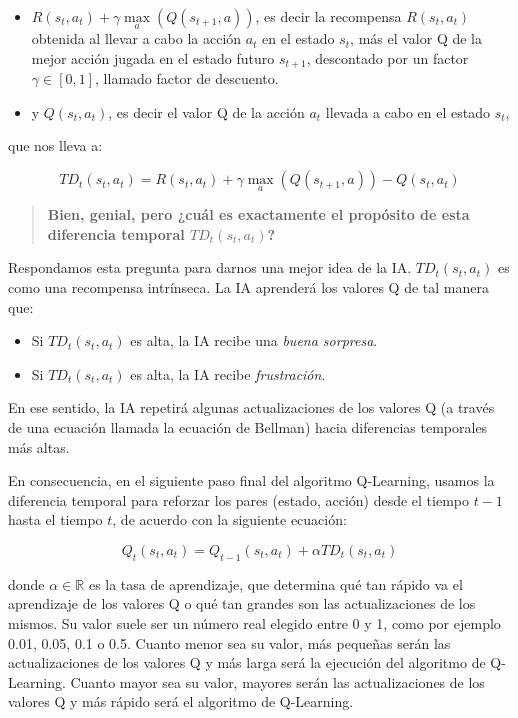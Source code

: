 \documentclass[
]{book}
\providecommand{\tightlist}{%
  \setlength{\itemsep}{0pt}\setlength{\parskip}{0pt}}
\begin{document}
\begin{itemize}
\item
  \(R(s_t,a_t) + \gamma \underset{a}{\max}(Q(s_{t+1},a))\), es decir la recompensa \(R (s_t, a_t)\) obtenida al llevar a cabo la acción \(a_t\) en el estado \(s_t\), más el valor Q de la mejor acción jugada en el estado futuro \(s_{t+1}\), descontado por un factor \(\gamma \in [0,1]\), llamado factor de descuento.
\item
  y \(Q(s_t, a_t)\), es decir el valor Q de la acción \(a_t\) llevada a cabo en el estado \(s_t\),
\end{itemize}

que nos lleva a:

\[TD_t(s_t,a_t) = R(s_t,a_t) + \gamma \underset{a}{\max}(Q(s_{t+1},a)) - Q(s_t,a_t)\]

\begin{quote}
\textbf{Bien, genial, pero ¿cuál es exactamente el propósito de esta diferencia temporal \(TD_t(s_t,a_t)\)?}
\end{quote}

Respondamos esta pregunta para darnos una mejor idea de la IA. \(TD_t (s_t, a_t)\) es como una recompensa intrínseca. La IA aprenderá los valores Q de tal manera que:

\begin{itemize}
\tightlist
\item
  Si \(TD_t(s_t,a_t)\) es alta, la IA recibe una \emph{buena sorpresa}.
\item
  Si \(TD_t(s_t,a_t)\) es alta, la IA recibe \emph{frustración}.
\end{itemize}

En ese sentido, la IA repetirá algunas actualizaciones de los valores Q (a través de una ecuación llamada la ecuación de Bellman) hacia diferencias temporales más altas.

En consecuencia, en el siguiente paso final del algoritmo Q-Learning, usamos la diferencia temporal para reforzar los pares (estado, acción) desde el tiempo \(t-1\) hasta el tiempo \(t\), de acuerdo con la siguiente ecuación:

\[Q_t(s_t,a_t) = Q_{t-1}(s_t,a_t) + \alpha TD_t(s_t,a_t)\]

donde \(\alpha \in \mathbb{R}\) es la tasa de aprendizaje, que determina qué tan rápido va el aprendizaje de los valores Q o qué tan grandes son las actualizaciones de los mismos. Su valor suele ser un número real elegido entre 0 y 1, como por ejemplo 0.01, 0.05, 0.1 o 0.5. Cuanto menor sea su valor, más pequeñas serán las actualizaciones de los valores Q y más larga será la ejecución del algoritmo de Q-Learning. Cuanto mayor sea su valor, mayores serán las actualizaciones de los valores Q y más rápido será el algoritmo de Q-Learning.
\end{document}
